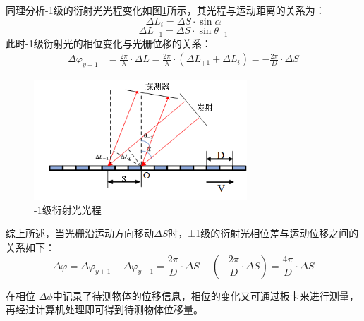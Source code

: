 \documentclass[type=master,oneside]{fduthesis}
\begin{document}
同理分析-1级的衍射光光程变化如图\ref{fig:-1级衍射光光程}所示，其光程与运动距离的关系为：
\begin{equation}
  \Delta L_{i}=\Delta S \cdot \sin \alpha
\end{equation}
\begin{equation}
  \Delta L_{-1}=\Delta S \cdot \sin \theta_{-1}
\end{equation}
此时-1级衍射光的相位变化与光栅位移的关系：
\begin{equation}
  \begin{aligned}
    \Delta \varphi_{y-1} & =\frac{2 \pi}{\lambda} \cdot \Delta L =\frac{2 \pi}{\lambda} \cdot\left(\Delta L_{+1}+\Delta L_{i}\right) =-\frac{2 \pi}{D} \cdot \Delta S
  \end{aligned}
\end{equation}
\begin{figure}[H]
  \centering
  \includegraphics[width=8cm]{2-fig/-1级光程差.png}
  \caption{-1级衍射光光程}
  \label{fig:-1级衍射光光程}
\end{figure}
综上所述，当光栅沿运动方向移动$\Delta S$时，±1级的衍射光相位差与运动位移之间的关系如下：
\begin{equation}
  \Delta \varphi=\Delta \varphi_{y+1}-\Delta \varphi_{y-1}=\frac{2 \pi}{D} \cdot \Delta S-(-\frac{2 \pi}{D} \cdot \Delta S)=\frac{4 \pi}{D} \cdot \Delta S
\end{equation}

在相位 $ \Delta \phi $中记录了待测物体的位移信息，相位的变化又可通过板卡来进行测量，再经过计算机处理即可得到待测物体位移量。
\end{document}
